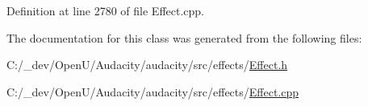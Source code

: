 Definition at line 2780 of file Effect.\+cpp.



The documentation for this class was generated from the following files\+:\begin{DoxyCompactItemize}
\item 
C\+:/\+\_\+dev/\+Open\+U/\+Audacity/audacity/src/effects/\hyperlink{src_2effects_2_effect_8h}{Effect.\+h}\item 
C\+:/\+\_\+dev/\+Open\+U/\+Audacity/audacity/src/effects/\hyperlink{src_2effects_2_effect_8cpp}{Effect.\+cpp}\end{DoxyCompactItemize}

